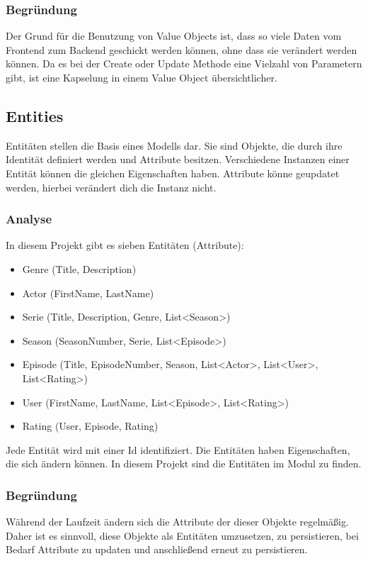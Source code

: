         \subsubsection{Begründung}
        Der Grund für die Benutzung von Value Objects ist, dass so viele Daten vom Frontend zum Backend geschickt werden können, ohne dass sie verändert werden können. Da es bei der Create oder Update Methode eine Vielzahl von Parametern gibt, ist eine Kapselung in einem Value Object übersichtlicher.

    \subsection{Entities} \label{1.entities}
    Entitäten stellen die Basis eines Modells dar. Sie sind Objekte, die durch ihre Identität definiert werden und Attribute besitzen. Verschiedene Instanzen einer Entität können die gleichen Eigenschaften haben. Attribute könne geupdatet werden, hierbei verändert dich die Instanz nicht. 

        \subsubsection{Analyse}
        In diesem Projekt gibt es sieben Entitäten (Attribute):
        \begin{itemize}
            \item Genre (Title, Description)
            \item Actor (FirstName, LastName)
            \item Serie (Title, Description, Genre, List<Season>)
            \item Season (SeasonNumber, Serie, List<Episode>)
            \item Episode (Title, EpisodeNumber, Season, List<Actor>, List<User>, List<Rating>)
            \item User (FirstName, LastName, List<Episode>, List<Rating>)
            \item Rating (User, Episode, Rating)
        \end{itemize}
        Jede Entität wird mit einer Id identifiziert. Die Entitäten haben Eigenschaften, die sich ändern können. In diesem Projekt sind die Entitäten im Modul  zu finden.

        \subsubsection{Begründung}
         Während der Laufzeit ändern sich die Attribute der dieser Objekte regelmäßig. Daher ist es sinnvoll, diese Objekte als Entitäten umzusetzen, zu persistieren, bei Bedarf Attribute zu updaten und anschließend erneut zu persistieren.

